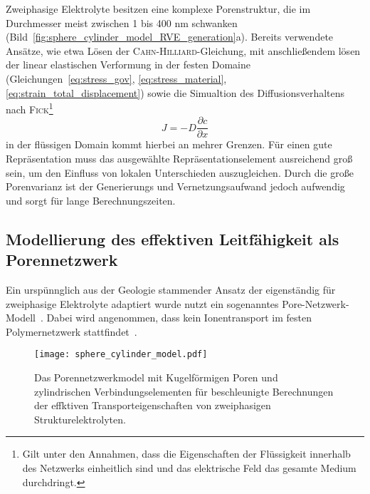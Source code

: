 Zweiphasige Elektrolyte besitzen eine komplexe Porenstruktur, die im Durchmesser meist zwischen 1 bis 400 $\si{\nano \metre}$ schwanken (Bild~\ref{fig:sphere_cylinder_model_RVE_generation}a). Bereits verwendete Ansätze, wie etwa Lösen der \textsc{Cahn-Hilliard}-Gleichung, mit anschließendem lösen der linear elastischen Verformung in der festen Domaine (Gleichungen~\ref{eq:stress_gov}, \ref{eq:stress_material}, \ref{eq:strain_total_displacement})
sowie die Simualtion des Diffusionsverhaltens nach \textsc{Fick}\footnote{Gilt unter den Annahmen, dass die Eigenschaften der Flüssigkeit innerhalb des Netzwerks einheitlich sind und das elektrische Feld das gesamte Medium durchdringt.}
\begin{equation}\label{eq:fick}
    J = -D \frac{\partial c}{\partial x}
\end{equation}
in der flüssigen Domain kommt hierbei an mehrer Grenzen. Für einen gute Repräsentation muss das ausgewählte Repräsentationselement ausreichend groß sein, um den Einfluss von lokalen Unterschieden auszugleichen. Durch die große Porenvarianz ist der Generierungs und Vernetzungsaufwand jedoch aufwendig und sorgt für lange Berechnungszeiten. 

\subsection{Modellierung des effektiven Leitfähigkeit als Porennetzwerk}
Ein urspünnglich aus der Geologie stammender Ansatz der eigenständig für zweiphasige Elektrolyte adaptiert wurde nutzt ein sogenanntes Pore-Netzwerk-Modell~\cite{Xiong2016,Gostick2016}. Dabei wird angenommen, dass kein Ionentransport im festen Polymernetzwerk stattfindet~\cite{Tu2020}.

\begin{figure}[!h]
        \center
		\texttt{[image: sphere\_cylinder\_model.pdf]}
		\caption{\label{fig:sphere_cylinder_model}Das Porennetzwerkmodel mit Kugelförmigen Poren und zylindrischen Verbindungselementen für beschleunigte Berechnungen der effktiven Transporteigenschaften von zweiphasigen Strukturelektrolyten.
        }
\end{figure}

